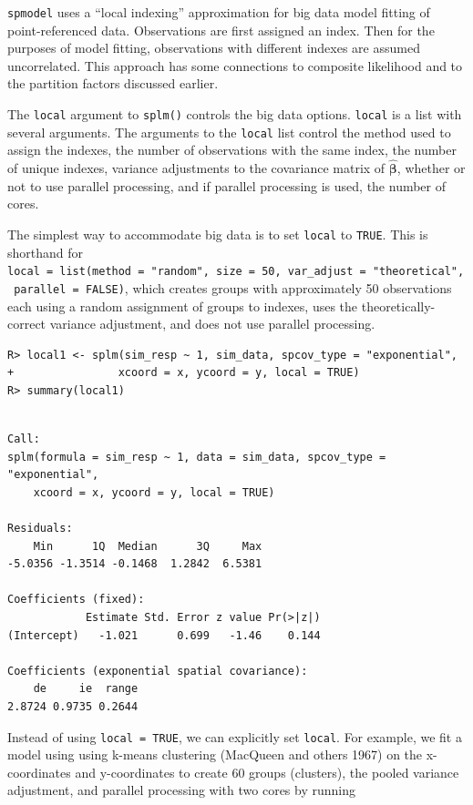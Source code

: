 \documentclass{article}
\begin{document}
\texttt{spmodel} uses a ``local indexing'' approximation for big data
model fitting of point-referenced data. Observations are first assigned
an index. Then for the purposes of model fitting, observations with
different indexes are assumed uncorrelated. This approach has some
connections to composite likelihood and to the partition factors
discussed earlier.

The \texttt{local} argument to \texttt{splm()} controls the big data
options. \texttt{local} is a list with several arguments. The arguments
to the \texttt{local} list control the method used to assign the
indexes, the number of observations with the same index, the number of
unique indexes, variance adjustments to the covariance matrix of
\(\hat{\boldsymbol{\beta}}\), whether or not to use parallel processing,
and if parallel processing is used, the number of cores.

The simplest way to accommodate big data is to set \texttt{local} to
\texttt{TRUE}. This is shorthand for
\texttt{local\ =\ list(method\ =\ "random",\ size\ =\ 50,\ var\_adjust\ =\ "theoretical",\ parallel\ =\ FALSE)},
which creates groups with approximately 50 observations each using a
random assignment of groups to indexes, uses the theoretically-correct
variance adjustment, and does not use parallel processing.

\begin{verbatim}
R> local1 <- splm(sim_resp ~ 1, sim_data, spcov_type = "exponential", 
+                xcoord = x, ycoord = y, local = TRUE)
R> summary(local1)
\end{verbatim}

\begin{verbatim}

Call:
splm(formula = sim_resp ~ 1, data = sim_data, spcov_type = "exponential", 
    xcoord = x, ycoord = y, local = TRUE)

Residuals:
    Min      1Q  Median      3Q     Max 
-5.0356 -1.3514 -0.1468  1.2842  6.5381 

Coefficients (fixed):
            Estimate Std. Error z value Pr(>|z|)
(Intercept)   -1.021      0.699   -1.46    0.144

Coefficients (exponential spatial covariance):
    de     ie  range 
2.8724 0.9735 0.2644 
\end{verbatim}

Instead of using \texttt{local\ =\ TRUE}, we can explicitly set
\texttt{local}. For example, we fit a model using using k-means
clustering (MacQueen and others 1967) on the x-coordinates and
y-coordinates to create 60 groups (clusters), the pooled variance
adjustment, and parallel processing with two cores by running
\end{document}

